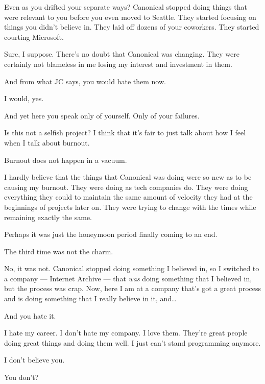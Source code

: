 \begin{ally}
Even as you drifted your separate ways? Canonical stopped doing things that were relevant to you before you even moved to Seattle. They started focusing on things you didn't believe in. They laid off dozens of your coworkers. They started courting Microsoft.
\end{ally}
Sure, I suppose. There's no doubt that Canonical was changing. They were certainly not blameless in me losing my interest and investment in them.

\begin{ally}
And from what JC says, you would hate them now.
\end{ally}
I would, yes.

\begin{ally}
And yet here you speak only of yourself. Only of your failures.
\end{ally}
Is this not a selfish project? I think that it's fair to just talk about how I feel when I talk about burnout.

\begin{ally}
Burnout does not happen in a vacuum.
\end{ally}
I hardly believe that the things that Canonical was doing were so new as to be causing my burnout. They were doing as tech companies do. They were doing everything they could to maintain the same amount of velocity they had at the beginnings of projects later on. They were trying to change with the times while remaining exactly the same.

Perhaps it was just the honeymoon period finally coming to an end.

\newpage

\begin{ally}
The third time was not the charm.
\end{ally}
No, it was not. Canonical stopped doing something I believed in, so I switched to a company --- Internet Archive --- that \emph{was} doing something that I believed in, but the process was crap. Now, here I am at a company that's got a great process and is doing something that I really believe in it, and\ldots{}

\begin{ally}
And you hate it.
\end{ally}
I hate my career. I don't hate my company. I love them. They're great people doing great things and doing them well. I just can't stand programming anymore.

\begin{ally}
I don't believe you.
\end{ally}
You don't?


